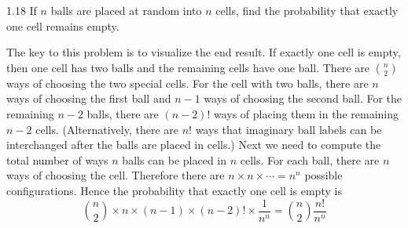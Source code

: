 \documentclass[12pt]{article}
\begin{document}
1.18
If $n$ balls are placed at random into $n$ cells, find the probability that
exactly one cell remains empty.

\bigskip
\noindent
The key to this problem is to visualize the end result.
If exactly one cell is empty, then one cell has two balls and the
remaining cells have one ball.
There are $\binom{n}{2}$ ways of choosing the two special cells.
For the cell with two balls, there are $n$ ways of choosing the
first ball and $n-1$ ways of choosing the second ball.
For the remaining $n-2$ balls, there are $(n-2)!$ ways of placing
them in the remaining $n-2$ cells.
(Alternatively, there are $n!$ ways that imaginary
ball labels can be interchanged after the balls are placed in cells.)
Next we need to compute the total number of ways $n$ balls can be
placed in $n$ cells.
For each ball, there are $n$ ways of choosing the cell.
Therefore there are $n\times n\times\cdots=n^n$
possible configurations.
Hence the probability that exactly one cell is empty is
\[
\binom{n}{2}\times n\times (n-1)\times(n-2)!\times\frac{1}{n^n}
=
\binom{n}{2}\frac{n!}{n^n}
\]
\end{document}
